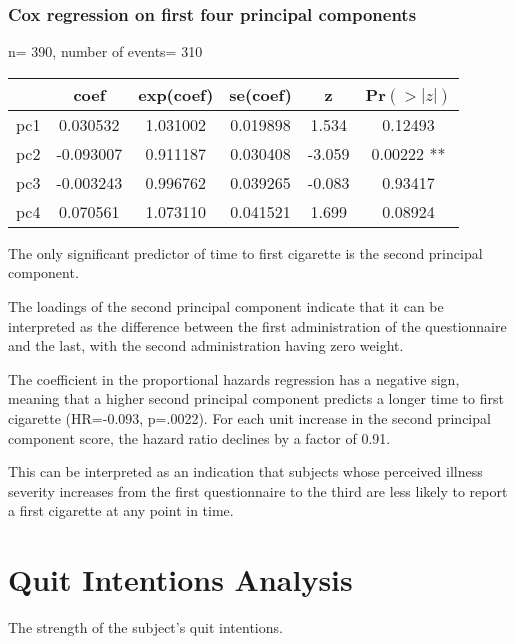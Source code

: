 \documentclass[12pt]{article}
\begin{document}
\subsubsection*{Cox regression on first four principal components}

  n= 390, number of events= 310
\par\vspace{0.3 cm}
\begin{tabular}{cccccc}
    &     coef & exp(coef) &  se(coef) & z   & Pr$(>|z|)$\\
\hline   
pc1 & 0.030532 & 1.031002  &0.019898 & 1.534 & 0.12493\\   
pc2 &-0.093007 & 0.911187  &0.030408 &-3.059 & 0.00222 **\\ 
pc3 &-0.003243 & 0.996762  &0.039265 &-0.083 & 0.93417\\   
pc4 & 0.070561 & 1.073110  &0.041521 & 1.699 & 0.08924  
\end{tabular}
\par\vspace{0.3 cm}
The only significant predictor of time to first cigarette is the second principal component.
\par\vspace{0.3 cm}
The loadings of the second principal component indicate that it can be interpreted as the difference between the first administration of the questionnaire and the last, with the second administration having zero weight.
\par\vspace{0.3 cm}
The coefficient in the proportional hazards regression has a negative sign, meaning that a higher second principal component predicts a longer time to first cigarette (HR=-0.093, p=.0022).  For each unit increase in the second principal component score, the hazard ratio declines by a factor of 0.91.
\par\vspace{0.3 cm}
This can be interpreted as an indication that subjects whose perceived illness severity increases from the first questionnaire to the third are less likely to report a first cigarette at any point in time.

\section*{Quit Intentions Analysis}
\par\vspace{0.3 cm}
The strength of the subject's quit intentions.  
\par\vspace{0.3 cm}
\end{document}
